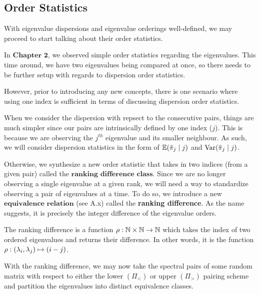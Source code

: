 \subsection{Order Statistics}
With eigenvalue dispersions and eigenvalue orderings well-defined, we may proceed to start talking about their order statistics.

In $\textbf{Chapter 2}$, we observed simple order statistics regarding the eigenvalues.
This time around, we have two eigenvalues being compared at once, so there needs to be further setup with regards to dispersion order statistics.

However, prior to introducing any new concepts, there is one scenario where using one index is sufficient in terms of discussing dispersion order statistics.

\begin{remark}
When we consider the dispersion with repsect to the consecutive pairs, things are much simpler since our pairs are intrinsically defined by one index ($j$).
This is because we are observing the $j^{th}$ eigenvalue and its smaller neighbour. As such, we will consider dispersion statistics in the form of $\mathbb{E}({\tilde{\pi}}_j \mid j)$ and $\text{Var}({\tilde{\pi}}_j \mid j)$.
\end{remark}

Otherwise, we synthesize a new order statistic that takes in two indices (from a given pair) called the $\textbf{ranking difference class}$.
Since we are no longer observing a single eigenvalue at a given rank, we will need a way to standardize observing a pair of eigenvalues at a time.
To do so, we introduce a new $\textbf{equivalence relation}$ (see A.x) called the \textbf{ranking difference}. As the name suggests, it is precisely the integer difference of the eigenvalue orders.


\begin{definition}
The ranking difference is a function ${\rho}: \mathbb{N} \times \mathbb{N} \to \mathbb{N}$ which takes the index of two ordered eigenvalues and returns their difference.
In other words, it is the function ${\rho}: (\lambda_i,\lambda_j) \mapsto (i - j)$.
\end{definition}

With the ranking difference, we may now take the spectral pairs of some random matrix with respect to either the lower $(\Pi_<)$ or upper $(\Pi_>)$ pairing scheme
and partition the eigenvalues into distinct equivalence classes.

